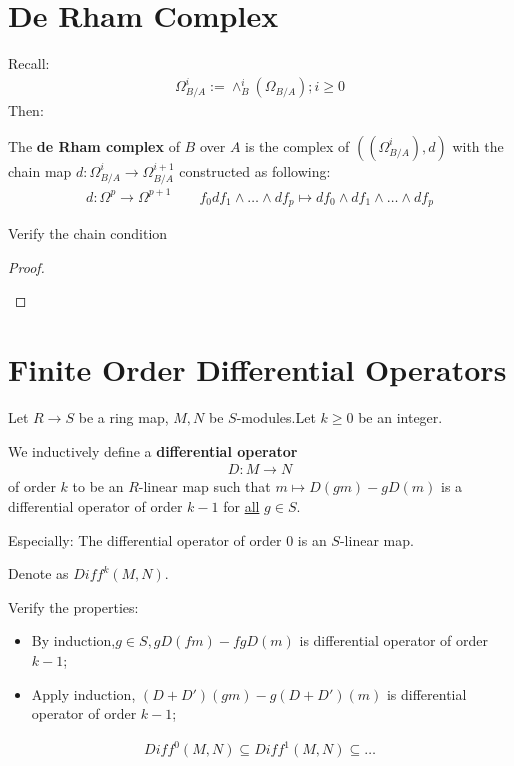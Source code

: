 \documentclass[Total.tex]{subfiles}
\begin{document}
		\section{De Rham Complex}
			Recall:
			\begin{gather*}
				\Omega_{B/A}^i:=\wedge^i_B (\Omega_{B/A});i\geq 0
			\end{gather*}
			Then:
			\begin{Def}
				The \textbf{de Rham complex} of $B$ over $A$ is the complex of $((\Omega^i_{B/A}),d)$ with the chain map $d:\Omega^i_{B/A}\rightarrow \Omega^{i+1}_{B/A}$ constructed as following:
				\begin{gather*}
					d:\Omega^p\rightarrow \Omega^{p+1}\qquad f_0df_1\wedge\dots\wedge df_p\mapsto df_0\wedge df_1\wedge\dots\wedge df_p
				\end{gather*}
			\end{Def}
			Verify the chain condition
			\begin{proof}
				\begin{center}
				\end{center}
			\end{proof}
		\section{Finite Order Differential Operators}
			\begin{Def}
				Let $R\rightarrow S$ be a ring map, $M,N$ be $S$-modules.Let $k\geq 0$ be an integer.
				
				We inductively define a \textbf{differential operator}
				\begin{gather*}
					D:M\rightarrow N
				\end{gather*}
				of order $k$ to be an $R$-linear map such that $m\mapsto D(gm)-gD(m)$ is a differential operator of order $k-1$ for \underline{all} $g\in S$.
				
				Especially: The differential operator of order $0$ is an $S$-linear map.
				
				Denote as $Diff^k(M,N)$.
			\end{Def}
			Verify the properties:
			\begin{itemize}
				\item By induction,$g\in S,gD(fm)-fgD(m)$ is differential operator of order $k-1$;
				\item Apply induction, $(D+D')(gm)-g(D+D')(m)$ is differential operator of order $k-1$;
			\end{itemize}
			\begin{gather*}
				Diff^0(M,N)\subseteq Diff^1(M,N)\subseteq \dots
			\end{gather*}
			
\end{document}
